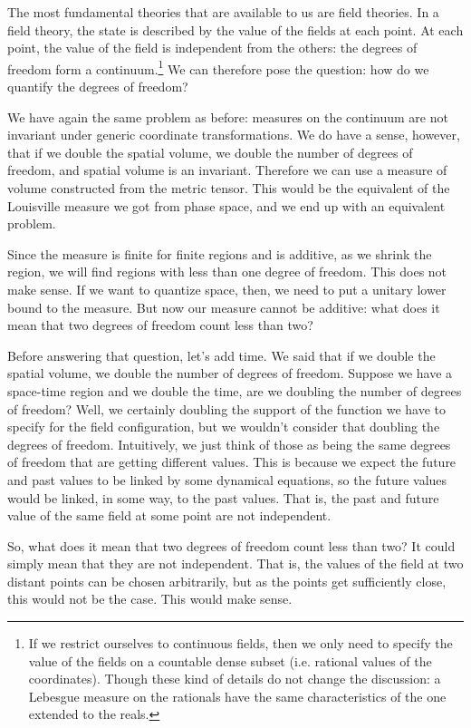 \documentclass[10pt,twocolumn, nofootinbib]{revtex4-2}
\begin{document}
The most fundamental theories that are available to us are field theories. In a field theory, the state is described by the value of the fields at each point. At each point, the value of the field is independent from the others: the degrees of freedom form a continuum.\footnote{If we restrict ourselves to continuous fields, then we only need to specify the value of the fields on a countable dense subset (i.e. rational values of the coordinates). Though these kind of details do not change the discussion: a Lebesgue measure on the rationals have the same characteristics of the one extended to the reals.} We can therefore pose the question: how do we quantify the degrees of freedom?

We have again the same problem as before: measures on the continuum are not invariant under generic coordinate transformations. We do have a sense, however, that if we double the spatial volume, we double the number of degrees of freedom, and spatial volume is an invariant. Therefore we can use a measure of volume constructed from the metric tensor. This would be the equivalent of the Louisville measure we got from phase space, and we end up with an equivalent problem.

Since the measure is finite for finite regions and is additive, as we shrink the region, we will find regions with less than one degree of freedom. This does not make sense. If we want to quantize space, then, we need to put a unitary lower bound to the measure. But now our measure cannot be additive: what does it mean that two degrees of freedom count less than two?

Before answering that question, let's add time. We said that if we double the spatial volume, we double the number of degrees of freedom. Suppose we have a space-time region and we double the time, are we doubling the number of degrees of freedom? Well, we certainly doubling the support of the function we have to specify for the field configuration, but we wouldn't consider that doubling the degrees of freedom. Intuitively, we just think of those as being the same degrees of freedom that are getting different values. This is because we expect the future and past values to be linked by some dynamical equations, so the future values would be linked, in some way, to the past values. That is, the past and future value of the same field at some point are not independent.

So, what does it mean that two degrees of freedom count less than two? It could simply mean that they are not independent. That is, the values of the field at two distant points can be chosen arbitrarily, but as the points get sufficiently close, this would not be the case. This would make sense.
\end{document}
